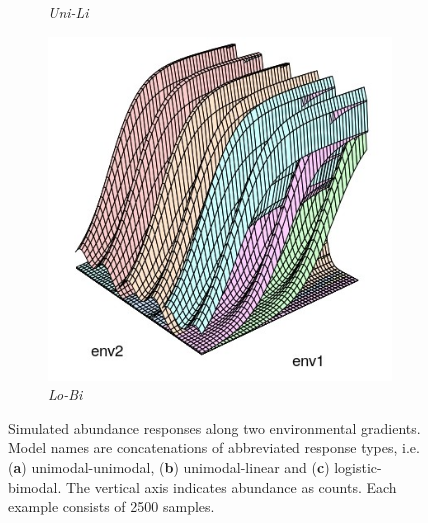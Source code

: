 \begin{figure}[h!]
\begin{subfigure}{0.3\textwidth}
				\caption{\textit{Uni-Li}}
			\end{subfigure}
			\begin{subfigure}{0.3\textwidth}
				\centering
				\includegraphics[width=1\linewidth]{../02_Figures/Lo-Bi_Model}
				\caption{\textit{Lo-Bi}}
				\label{fig:bivariateExample3}
			\end{subfigure}
			\caption{Simulated abundance responses along two environmental gradients. Model names are concatenations of abbreviated response types, i.e. (\textbf{a}) unimodal-unimodal, (\textbf{b}) unimodal-linear and (\textbf{c}) logistic-bimodal. The vertical axis indicates abundance as counts.
				Each example consists of 2500 samples.}
			\label{fig:bivariateExample}
		\end{figure}
	
		
